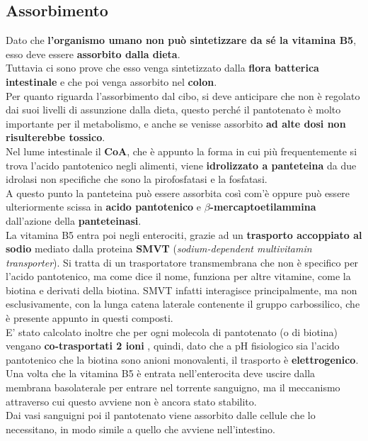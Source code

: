 \documentclass[a4paper, 12pt]{article}
\begin{document}
\subsection{Assorbimento}
Dato che \textbf{l’organismo umano non può sintetizzare da sé la vitamina B5}, esso deve essere \textbf{assorbito dalla dieta}.\\ Tuttavia ci sono prove che esso venga sintetizzato dalla \textbf{flora batterica intestinale} e che poi venga assorbito nel \textbf{colon}.\\
Per quanto riguarda l’assorbimento dal cibo, si deve anticipare che non è regolato dai suoi livelli di assunzione dalla dieta, questo perché il pantotenato è molto importante per il metabolismo, e anche se venisse assorbito \textbf{ad alte dosi non risulterebbe tossico}.\\
Nel lume intestinale il \textbf{CoA}, che è appunto la forma in cui più frequentemente si trova l’acido pantotenico negli alimenti, viene \textbf{idrolizzato a panteteina} da due idrolasi non specifiche che sono la pirofosfatasi e la fosfatasi.\\
A questo punto la panteteina può essere assorbita così com’è oppure può essere ulteriormente scissa in \textbf{acido pantotenico} e \textbf{$\beta$-mercaptoetilammina} dall’azione della \textbf{panteteinasi}.\\
La vitamina B5 entra poi negli enterociti, grazie ad un \textbf{trasporto accoppiato al sodio} mediato dalla proteina \textbf{SMVT} (\textit{sodium-dependent multivitamin transporter}). Si tratta di un trasportatore transmembrana che non è specifico per l’acido pantotenico, ma come dice il nome, funziona per altre vitamine, come la biotina e derivati della biotina. SMVT infatti interagisce principalmente, ma non esclusivamente, con la lunga catena laterale contenente il gruppo carbossilico, che è presente appunto in questi composti.\\
E’ stato calcolato inoltre che per ogni molecola di pantotenato (o di biotina) vengano \textbf{co-trasportati 2 ioni }, quindi, dato che a pH fisiologico sia l’acido pantotenico che la biotina sono anioni monovalenti, il trasporto è \textbf{elettrogenico}.\\
Una volta che la vitamina B5 è entrata nell’enterocita deve uscire dalla membrana basolaterale per entrare nel torrente sanguigno, ma il meccanismo attraverso cui questo avviene non è ancora stato stabilito.\\
Dai vasi sanguigni poi il pantotenato viene assorbito dalle cellule che lo necessitano, in modo simile a quello che avviene nell’intestino.\\
\end{document}
